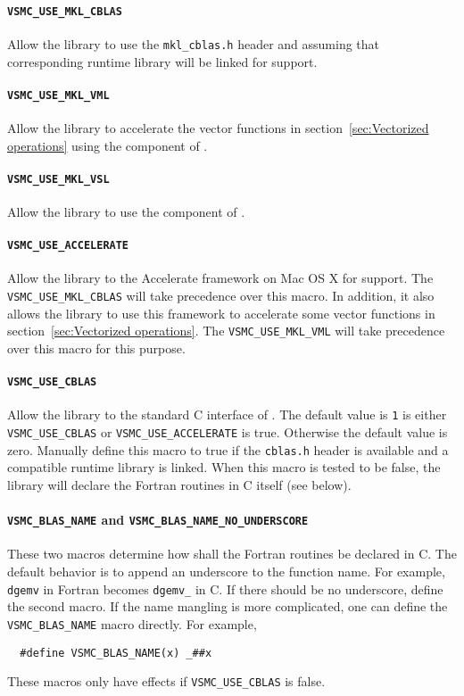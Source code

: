 \paragraph{\texttt{VSMC\_USE\_MKL\_CBLAS}} Allow the library to use the
\verb|mkl_cblas.h| header and assuming that corresponding runtime library will
be linked for \blas support.

\paragraph{\texttt{VSMC\_USE\_MKL\_VML}} Allow the library to accelerate the
vector functions in section~\ref{sec:Vectorized operations} using the \vml
component of \mkl.

\paragraph{\texttt{VSMC\_USE\_MKL\_VSL}} Allow the library to use the \vsl
component of \mkl.

\paragraph{\texttt{VSMC\_USE\_ACCELERATE}} Allow the library to the Accelerate
framework on Mac OS X for \blas support. The \verb|VSMC_USE_MKL_CBLAS| will
take precedence over this macro. In addition, it also allows the library to use
this framework to accelerate some vector functions in
section~\ref{sec:Vectorized operations}. The \verb|VSMC_USE_MKL_VML| will take
precedence over this macro for this purpose.

\paragraph{\texttt{VSMC\_USE\_CBLAS}} Allow the library to the standard C
interface of \blas. The default value is \verb|1| is either
\verb|VSMC_USE_CBLAS| or \verb|VSMC_USE_ACCELERATE| is true. Otherwise the
default value is zero. Manually define this macro to true if the \verb|cblas.h|
header is available and a compatible runtime library is linked. When this macro
is tested to be false, the library will declare the \blas Fortran routines in C
itself (see below).

\paragraph{\texttt{VSMC\_BLAS\_NAME} and
  \texttt{VSMC\_BLAS\_NAME\_NO\_UNDERSCORE}} These two macros determine how
shall the \blas Fortran routines be declared in C. The default behavior is to
append an underscore to the function name. For example, \verb|dgemv| in Fortran
becomes \verb|dgemv_| in C. If there should be no underscore, define the second
macro. If the name mangling is more complicated, one can define the
\verb|VSMC_BLAS_NAME| macro directly. For example,
\begin{Verbatim}
  #define VSMC_BLAS_NAME(x) _##x
\end{Verbatim}
These macros only have effects if \verb|VSMC_USE_CBLAS| is false.

